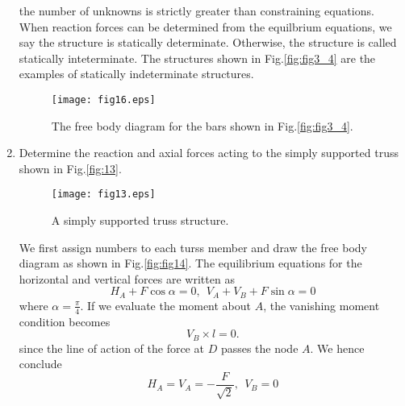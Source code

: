 \documentclass[10pt,a4j]{article}
\begin{document}
\begin{enumerate}
{	the number of unknowns is strictly greater than constraining equations.  
	When reaction forces can be determined from the equilbrium equations, 
		we say the structure is statically determinate. 
		Otherwise, the structure is called statically inteterminate.
	The structures shown in Fig.\ref{fig:fig3_4} are the examples of 
	statically indeterminate structures.
}
\begin{figure}[h]
	\begin{center}
	\texttt{[image: fig16.eps]} 
	\end{center}
	\caption{The free body diagram for the bars shown in Fig.\ref{fig:fig3_4}.} 
	\label{fig:fig16}
\end{figure}
\item
	Determine the reaction and axial forces acting to the simply supported 
	truss shown in Fig.\ref{fig:13}.
\begin{figure}[h]
	\begin{center}
	\texttt{[image: fig13.eps]} 
	\end{center}
	\caption{A simply supported truss structure.} 
	\label{fig:fig13}
\end{figure}
{\small 
	We first assign numbers to each turss member and draw the free body 
	diagram as shown in Fig.\ref{fig:fig14}.
	The equilibrium equations for the horizontal and vertical forces 
	are written as 
	\[ 
		H_A+F\cos\alpha =0 , \ \ V_A+V_B+F\sin\alpha=0
	\]
	where $\alpha=\frac{\pi}{4}$.
	If we evaluate the moment about $A$, the vanishing moment condition 
	becomes
	\[
		V_B\times l =0.
	\]
	since the line of action of the force at $D$ passes the node $A$. 
	We hence conclude 
	\[
		H_A=V_A=-\frac{F}{\sqrt{2}}, \ \ V_B=0
	\]

}
\end{enumerate}
\end{document}
